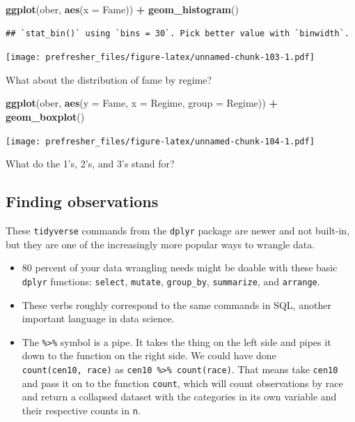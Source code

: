 \documentclass[]{book}
\newenvironment{Shaded}{\begin{snugshade}}{\end{snugshade}}
\newcommand{\KeywordTok}[1]{\textcolor[rgb]{0.13,0.29,0.53}{\textbf{#1}}}
\newcommand{\DataTypeTok}[1]{\textcolor[rgb]{0.13,0.29,0.53}{#1}}
\newcommand{\StringTok}[1]{\textcolor[rgb]{0.31,0.60,0.02}{#1}}
\newcommand{\OperatorTok}[1]{\textcolor[rgb]{0.81,0.36,0.00}{\textbf{#1}}}
\newcommand{\NormalTok}[1]{#1}
\providecommand{\tightlist}{%
  \setlength{\itemsep}{0pt}\setlength{\parskip}{0pt}}
\theoremstyle{definition}
\theoremstyle{definition}
\theoremstyle{definition}
\theoremstyle{remark}
\begin{document}
\begin{Shaded}
\begin{Highlighting}[]
\KeywordTok{ggplot}\NormalTok{(ober, }\KeywordTok{aes}\NormalTok{(}\DataTypeTok{x =}\NormalTok{ Fame)) }\OperatorTok{+}\StringTok{ }\KeywordTok{geom_histogram}\NormalTok{()}
\end{Highlighting}
\end{Shaded}

\begin{verbatim}
## `stat_bin()` using `bins = 30`. Pick better value with `binwidth`.
\end{verbatim}

\texttt{[image: prefresher\_files/figure-latex/unnamed-chunk-103-1.pdf]}

What about the distribution of fame by regime?

\begin{Shaded}
\begin{Highlighting}[]
\KeywordTok{ggplot}\NormalTok{(ober, }\KeywordTok{aes}\NormalTok{(}\DataTypeTok{y =}\NormalTok{ Fame, }\DataTypeTok{x =}\NormalTok{ Regime, }\DataTypeTok{group =}\NormalTok{ Regime)) }\OperatorTok{+}
\StringTok{  }\KeywordTok{geom_boxplot}\NormalTok{()}
\end{Highlighting}
\end{Shaded}

\texttt{[image: prefresher\_files/figure-latex/unnamed-chunk-104-1.pdf]}

What do the 1's, 2's, and 3's stand for?

\subsection{Finding observations}\label{finding-observations}

These \texttt{tidyverse} commands from the \texttt{dplyr} package are
newer and not built-in, but they are one of the increasingly more
popular ways to wrangle data.

\begin{itemize}
\tightlist
\item
  80 percent of your data wrangling needs might be doable with these
  basic \texttt{dplyr} functions: \texttt{select}, \texttt{mutate},
  \texttt{group\_by}, \texttt{summarize}, and \texttt{arrange}.
\item
  These verbs roughly correspond to the same commands in SQL, another
  important language in data science.
\item
  The \texttt{\%\textgreater{}\%} symbol is a pipe. It takes the thing
  on the left side and pipes it down to the function on the right side.
  We could have done \texttt{count(cen10,\ race)} as
  \texttt{cen10\ \%\textgreater{}\%\ count(race)}. That means take
  \texttt{cen10} and pass it on to the function \texttt{count}, which
  will count observations by race and return a collapsed dataset with
  the categories in its own variable and their respective counts in
  \texttt{n}.
\end{itemize}
\end{document}

